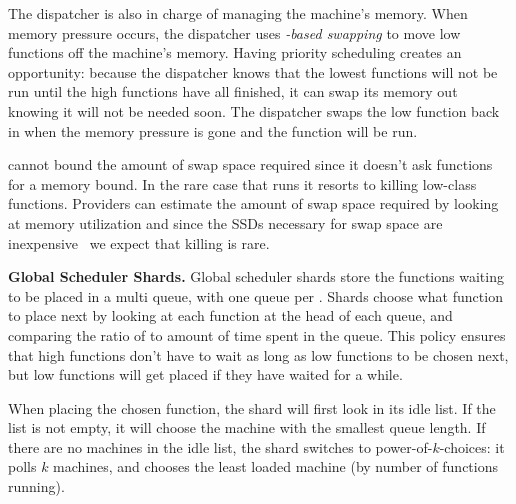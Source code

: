 The dispatcher is also in charge of managing the machine's memory. When memory
pressure occurs, the dispatcher uses \textit{\class{}-based swapping} to move
low \class{} functions off the machine's memory. Having priority scheduling
creates an opportunity: because the dispatcher knows that the lowest \class{}
functions will not be run until the high \class{} functions have all finished,
it can swap its memory out knowing it will not be needed soon. The dispatcher
swaps the low \class{} function back in when the memory pressure is gone and the
function will be run.

\Sys cannot bound the amount of swap space required since it doesn't
ask functions for a memory bound.  In the rare case that \sys runs it
resorts to killing low-class functions.  Providers can estimate the
amount of swap space required by looking at memory utilization and
since the SSDs necessary for swap space are
inexpensive~\cite{ssd-price} we expect that killing is rare.

\textbf{Global Scheduler Shards.}
Global scheduler shards store the functions waiting to be placed in a multi
queue, with one queue per \priceclass{}. Shards choose what function to place
next by looking at each function at the head of each queue, and comparing the
ratio of \class{} to amount of time spent in the queue. This policy ensures
that high \class{} functions don't have to wait as long as low \class{}
functions to be chosen next, but low \class{} functions will get placed if they
have waited for a while.

When placing the chosen function, the shard will first look in its
idle list. If the list is not empty, it will choose the machine with
the smallest queue length.  If there are no machines in the idle list,
the shard switches to power-of-$k$-choices: it polls $k$ machines, and
chooses the least loaded machine (by number of functions running).
